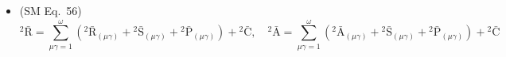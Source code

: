 \documentclass[
    12pt,              %
    a4paper,           %
    headings=normal,   %
    twoside=true,      %
    BCOR=8mm,          %
]{scrbook}
\begin{document}
\begin{itemize}[label={},leftmargin=0pt]
\[\begin{aligned}
    &\quad + \sum_{\mu\gamma\chi\lambda=1}^{\omega} \left( \mathrm{K}^\mathrm{i}_{\mathrm{s,l}}(\mu\gamma)\mathrm{K}^\mathrm{s}_{\mathrm{km}}(\chi\lambda) - \mathrm{K}^\mathrm{i}_{\mathrm{sm}}(\mu\gamma)\mathrm{K}^\mathrm{s}_{\mathrm{kl}}(\chi\lambda) \right) + \sum_{\mu\gamma\chi\lambda=1}^{\omega} \left( \mathrm{K}^\mathrm{i}_{\mathrm{s,l}}(\mu\gamma)\left\{ \begin{smallmatrix} \mathrm{s} \\ \mathrm{k\ m} \end{smallmatrix} \right\}^{(\chi)}_{(\lambda)} + \right. \\
    &\quad \left. + \left\{ \begin{smallmatrix} \mathrm{i} \\ \mathrm{s\ l} \end{smallmatrix} \right\}^{(\mu)}_{(\gamma)}\mathrm{K}^\mathrm{s}_{\mathrm{km}}(\chi\lambda) - \mathrm{K}^\mathrm{i}_{\mathrm{sm}}(\mu\gamma)\left\{ \begin{smallmatrix} \mathrm{s} \\ \mathrm{k\ l} \end{smallmatrix} \right\}^{(\chi)}_{(\lambda)} - \left\{ \begin{smallmatrix} \mathrm{i} \\ \mathrm{s\ m} \end{smallmatrix} \right\}^{(\mu)}_{(\gamma)}\mathrm{K}^\mathrm{s}_{\mathrm{kl}}(\chi\lambda) \right) = \\
    &= \sum_{\mu\gamma=1}^{\omega} \left( \mathrm{R}^\mathrm{i}_{(\mu\gamma)\mathrm{klm}} + \mathrm{S}^\mathrm{i}_{(\mu\gamma)\mathrm{klm}} + \mathrm{P}^\mathrm{i}_{(\mu\gamma)\mathrm{klm} } \right) + \mathrm{C}^\mathrm{i}_{\mathrm{klm}}, \quad {}^4\bar{\mathrm{R}} = \sum_{\mu\gamma=1}^{\omega} \left( {}^4\bar{\mathrm{R}}_{(\mu\gamma)} + {}^4\bar{\mathrm{S}}_{(\mu\gamma)} + {}^4\bar{\mathrm{P}}_{(\mu\gamma)} \right) + {}^4\bar{\mathrm{C}}
    \end{aligned}
    \]

    \item (SM Eq.\ 56) 
    \[
    {}^2\bar{\mathrm{R}} = \sum_{\mu\gamma=1}^{\omega} \left( {}^2\bar{\mathrm{R}}_{(\mu\gamma)} + {}^2\bar{\mathrm{S}}_{(\mu\gamma)} + {}^2\bar{\mathrm{P}}_{(\mu\gamma)} \right) + {}^2\bar{\mathrm{C}}, \quad {}^2\bar{\mathrm{A}} = \sum_{\mu\gamma=1}^{\omega} \left( {}^2\bar{\mathrm{A}}_{(\mu\gamma)} + {}^2\bar{\mathrm{S}}_{(\mu\gamma)} + {}^2\bar{\mathrm{P}}_{(\mu\gamma)} \right) + {}^2\bar{\mathrm{C}}
    \]


\end{itemize}
\end{document}

